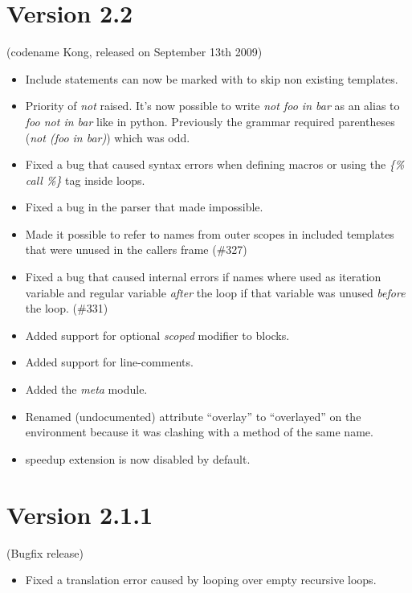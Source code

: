 \documentclass[a4paper,10pt,english]{sphinxmanual}
\begin{document}
\section{Version 2.2}
\label{changelog:version-2-2}
(codename Kong, released on September 13th 2009)
\begin{itemize}
\item {} 
Include statements can now be marked with  to skip
non existing templates.

\item {} 
Priority of \emph{not} raised.  It's now possible to write \emph{not foo in bar}
as an alias to \emph{foo not in bar} like in python.  Previously the grammar
required parentheses (\emph{not (foo in bar)}) which was odd.

\item {} 
Fixed a bug that caused syntax errors when defining macros or using the
\emph{\{\% call \%\}} tag inside loops.

\item {} 
Fixed a bug in the parser that made  impossible.

\item {} 
Made it possible to refer to names from outer scopes in included templates
that were unused in the callers frame (\#327)

\item {} 
Fixed a bug that caused internal errors if names where used as iteration
variable and regular variable \emph{after} the loop if that variable was unused
\emph{before} the loop.  (\#331)

\item {} 
Added support for optional \emph{scoped} modifier to blocks.

\item {} 
Added support for line-comments.

\item {} 
Added the \emph{meta} module.

\item {} 
Renamed (undocumented) attribute ``overlay'' to ``overlayed'' on the
environment because it was clashing with a method of the same name.

\item {} 
speedup extension is now disabled by default.

\end{itemize}


\section{Version 2.1.1}
\label{changelog:version-2-1-1}
(Bugfix release)
\begin{itemize}
\item {} 
Fixed a translation error caused by looping over empty recursive loops.

\end{itemize}
\end{document}
